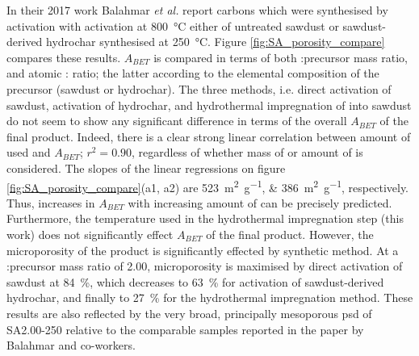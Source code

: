 In their 2017 work Balahmar \textit{et al.} report carbons which were synthesised by activation with   activation at \qty{800}{\degreeCelsius} either of untreated sawdust or sawdust-derived \gls{hydrochar} synthesised at \qty{250}{\degreeCelsius}.\citep{Balahmar2017Biomass} Figure \ref{fig:SA_porosity_compare} compares these results. $A_{BET}$ is compared in terms of both :precursor mass ratio, and atomic : ratio; the latter according to the elemental composition of the precursor (sawdust or \gls{hydrochar}). The three methods, i.e. direct activation of sawdust, activation of \gls{hydrochar}, and hydrothermal impregnation of  into sawdust do not seem to show any significant difference in terms of the overall $A_{BET}$ of the final product. Indeed, there is a clear strong linear correlation  between amount of  used and $A_{BET}$; $r^2=0.90$, regardless of whether mass of  or amount of  is considered. The slopes of the linear regressions on figure \ref{fig:SA_porosity_compare}(a1, a2) are \qtylist[list-units=single]{523;386}{\metre\squared\per\gram}, respectively. Thus, increases in $A_{BET}$ with increasing amount of  can be precisely predicted. Furthermore, the temperature used in the hydrothermal impregnation step (this work) does not significantly effect $A_{BET}$ of the final product. However, the microporosity of the product is significantly effected by synthetic method. At a :precursor mass ratio of 2.00, microporosity is maximised by direct activation of sawdust at \qty{84}{\percent}, which decreases to \qty{63}{\percent} for activation of sawdust-derived \gls{hydrochar}, and finally to \qty{27}{\percent} for the hydrothermal impregnation method. These results are also reflected by the very broad, principally mesoporous \gls{psd} of SA2.00-250 relative to the comparable samples reported in the paper by Balahmar and co-workers.\citep{Balahmar2017Biomass} 

